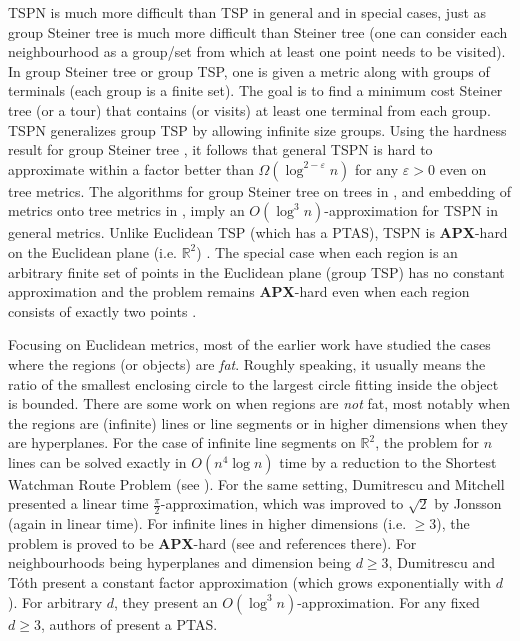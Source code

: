 \documentclass[pdflatex,sn-mathphys-num]{sn-jnl}
\theoremstyle{thmstyleone}
\newcommand{\RR}{\mathbb{R}}
\newcommand{\eps}{\varepsilon}
\begin{document}
	TSPN is much more difficult than TSP in general and in special cases, just as group Steiner tree is much more difficult than Steiner tree (one can consider each neighbourhood as a group/set from which at least one point needs to be visited). In group Steiner tree or group TSP, one is given a metric along with groups of terminals (each group is a finite set). The goal is to find a minimum cost Steiner tree (or a tour) that contains (or visits) at least one terminal from each group. TSPN generalizes group TSP by allowing infinite size groups. Using the hardness result for group Steiner tree \cite{HK03}, it follows that general TSPN is hard to approximate within a factor better than $\Omega(\log^{2-\eps} n)$ for any $\eps>0$ even on tree metrics. The algorithms for group Steiner tree on trees in \cite{Garg98}, and embedding of metrics onto tree metrics in \cite{FRT04}, imply an $O(\log^3 n)$-approximation for TSPN in general metrics.  
	Unlike Euclidean TSP (which has a PTAS), TSPN is \textbf{APX}-hard on the Euclidean plane (i.e. $\RR^2$) \cite{Berg05}. 
	The special case when each region is an arbitrary finite set of points in the Euclidean plane (group TSP) has no constant
	approximation \cite{SafraS03} and the problem remains \textbf{APX}-hard even when each region consists of exactly two points \cite{DO08}.
	
	Focusing on Euclidean metrics, most of the earlier work have studied the cases where the regions (or objects) are {\em fat}. Roughly speaking, it usually means the ratio of the smallest enclosing circle to the largest circle fitting inside the object is bounded. There are some work on when regions are {\em not} fat, most notably when the regions are (infinite) lines or line segments or in higher dimensions when they  are hyperplanes. For the case of infinite line segments on $\RR^2$, the problem for $ n $ lines can be solved exactly in $O(n^4\log n)$ time by a reduction
	to the Shortest Watchman Route Problem (see \cite{DELM03,Jonsson02}). For the same setting,
	Dumitrescu and Mitchell \cite{DM03} presented a linear time $\frac{\pi}{2}$-approximation, which was improved to $\sqrt{2}$ by Jonsson \cite{Jonsson02} (again in linear time).
	For infinite lines in higher dimensions (i.e. $\geq 3$), the problem is proved to be \textbf{APX}-hard (see \cite{AKL022} and references there). For neighbourhoods being hyperplanes and dimension being $d\geq 3$, Dumitrescu and T\'{o}th \cite{DM16} present a constant factor approximation (which grows exponentially with $d$). For arbitrary $d$, they  present an $O(\log^3 n)$-approximation. For any fixed $d\geq 3$, authors of \cite{AF20} present a PTAS.
	
\end{document}
